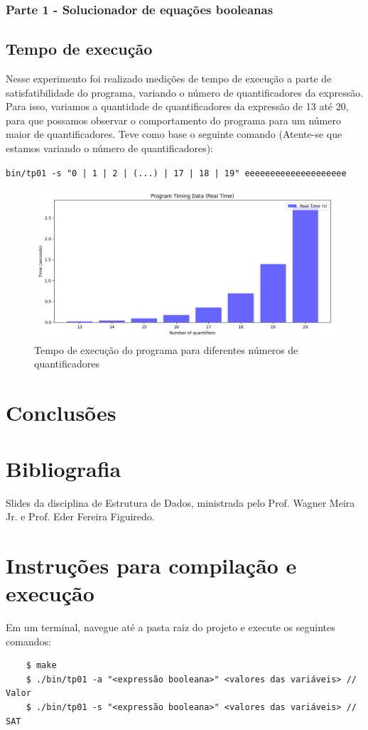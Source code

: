 \documentclass{article}
\begin{document}
\subsubsection{Parte 1 - Solucionador de equações booleanas}



\subsection{Tempo de execução}

Nesse experimento foi realizado medições de tempo de execução a parte de satisfatibilidade do programa, variando o número de quantificadores da expressão. Para isso,
variamos a quantidade de quantificadores da expressão de 13 até 20, para que possamos observar o comportamento do programa para um número maior de quantificadores.
Teve como base o seguinte comando (Atente-se que estamos variando o número de quantificadores): 


\verb#bin/tp01 -s "0 | 1 | 2 | (...) | 17 | 18 | 19" eeeeeeeeeeeeeeeeeeee#

\begin{figure}[H]
    \centering
    \includegraphics[width=\textwidth]{./time.png}
    \caption{Tempo de execução do programa para diferentes números de quantificadores}
    \label{fig:time}
\end{figure}

\section{Conclusões}

\section*{Bibliografia}

Slides da disciplina de Estrutura de Dados, ministrada pelo Prof. Wagner Meira Jr. e Prof. Eder Fereira Figuiredo.


\section*{Instruções para compilação e execução}

Em um terminal, navegue até a pasta raiz do projeto e execute os seguintes comandos:

\begin{verbatim}
    $ make
    $ ./bin/tp01 -a "<expressão booleana>" <valores das variáveis> // Valor 
    $ ./bin/tp01 -s "<expressão booleana>" <valores das variáveis> // SAT
\end{verbatim}
\end{document}
